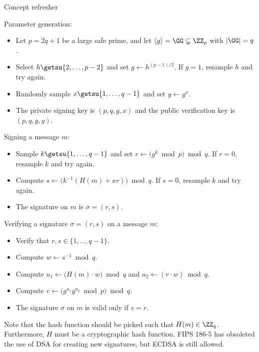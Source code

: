 \documentclass{practice}
\begin{document}
\newpage

\begin{center}
  Concept refresher
\end{center}

\begin{tcolorbox}[title=Digital Signature Algorithm (DSA)]
  Parameter generation:
  \begin{itemize}
    \item Let $p = 2q + 1$ be a large safe prime, and let $\langle g\rangle = \GG \subsetneq \ZZ_p$ with $\lvert \GG\rvert = q$.
    \item Select $h \getsu \{2, \dots, p-2\}$ and set $g \gets h^{(p-1)/2}$.
    If $g = 1$, resample $h$ and try again.
    \item Randomly sample $x \getsu \{1, \dots, q-1\}$ and set $y \gets g^x$.
    \item The private signing key is $(p, q, g, x)$ and the public verification key is $(p, q, g, y)$.
  \end{itemize}

  Signing a message $m$:
  \begin{itemize}
    \item Sample $k \getsu \{1, \dots, q-1\}$ and set $r \gets \bigl(g^k \bmod{p}\bigr) \bmod{q}$.
    If $r = 0$, resample $k$ and try again.
    \item Compute $s \gets \bigl(k^{-1}(H(m)+xr)\bigr) \bmod{q}$.
    If $s = 0$, resample $k$ and try again.
    \item The signature on $m$ is $\sigma = (r, s)$.
  \end{itemize}

  Verifying a signature $\sigma = (r, s)$ on a message $m$:
  \begin{itemize}
    \item Verify that $r, s \in \{1, \dots, q-1\}$.
    \item Compute $w \gets s^{-1}\bmod{q}$.
    \item Compute $u_1 \gets \bigl(H(m) \cdot w\bigr)\bmod{q}$ and $u_2 \gets (r\cdot w)\bmod{q}$.
    \item Compute $v \gets \bigl(g^{u_1}y^{u_2} \bmod{p}\bigr)\bmod{q}$.
    \item The signature $\sigma$ on $m$ is valid only if $v = r$.
    
    \iffalse
    Indeed, notice that
    \[
      k \equiv H(m)s^{-1} + xrs^{-1}
        \equiv H(m)w + xrw \pmod{q}.
    \]
    Since $g$ has order $q$, we have
    \[
      g^k \equiv g^{H(m)w + xrw} \equiv g^{H(m)w} \cdot y^{rw} \equiv g^{u_1} \cdot y^{u_2} \pmod{q}.
    \]
    Finally,
    \[
      r = \bigl(g^k \bmod{p}\bigr)\bmod{q} = (g^{u_1} \cdot y^{u_2} \bmod{p}) \bmod{q} = v.
    \]
    \fi
  \end{itemize}

  Note that the hash function should be picked such that $H(m) \in \ZZ_q$.
  Furthermore, $H$ must be a cryptographic hash function.
  \tcblower
  FIPS 186-5 has obsoleted the use of DSA for creating new signatures, but ECDSA is still allowed.
\end{tcolorbox}
\end{document}
